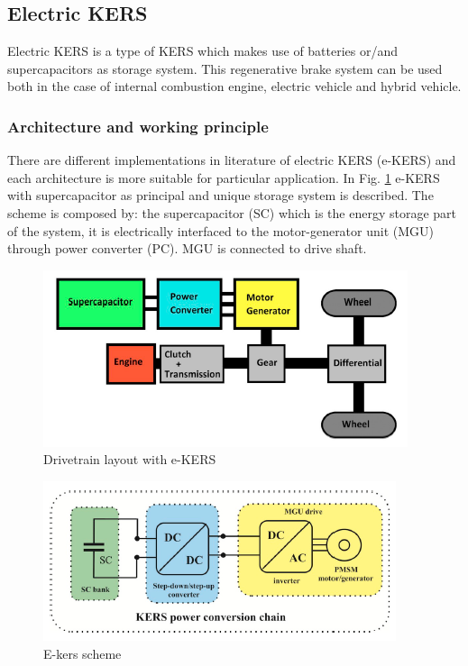 \documentclass[11pt]{article}
\begin{document}
\subsection{Electric KERS}

Electric KERS is a type of KERS which makes use of batteries or/and supercapacitors as storage system. This regenerative brake system can be used both in the case of internal combustion engine, electric vehicle and hybrid vehicle.

\subsubsection{Architecture and working principle}

There are different implementations in literature of electric KERS (e-KERS) and each architecture is more suitable for particular application. In Fig. \ref{ekersdrivetrainuc} e-KERS with supercapacitor as principal and unique storage system is described. The scheme is composed by: the supercapacitor (SC) which is the energy storage part of the system, it is electrically interfaced to the motor-generator unit (MGU) through power converter (PC). MGU is connected to drive shaft. 

\begin{figure}[H]
	\centering
	\includegraphics[width=.6\textwidth]{Images/State_of_the_art/Electric_KERS_uconly.PNG}
	\caption{Drivetrain layout with e-KERS}
	\label{ekersdrivetrainuc}
\end{figure}
 
\begin{figure}[H]
	\centering
	\includegraphics[width=.6\textwidth]{Images/State_of_the_art/Electric_KERS_scheme_uconly.PNG}
	\caption{E-kers scheme}
	\label{ekersschemeuc}
\end{figure}
\end{document}
